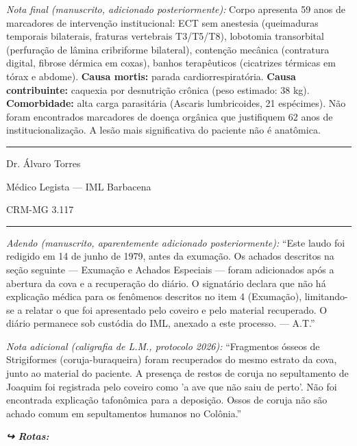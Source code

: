 \noindent \textit{Nota final (manuscrito, adicionado posteriormente):} Corpo apresenta 59 anos de marcadores de intervenção institucional: ECT sem anestesia (queimaduras temporais bilaterais, fraturas vertebrais T3/T5/T8), lobotomia transorbital (perfuração de lâmina cribriforme bilateral), contenção mecânica (contratura digital, fibrose dérmica em coxas), banhos terapêuticos (cicatrizes térmicas em tórax e abdome). \textbf{Causa mortis:} parada cardiorrespiratória. \textbf{Causa contribuinte:} caquexia por desnutrição crônica (peso estimado: 38 kg). \textbf{Comorbidade:} alta carga parasitária (Ascaris lumbricoides, 21 espécimes). Não foram encontrados marcadores de doença orgânica que justifiquem 62 anos de institucionalização. A lesão mais significativa do paciente não é anatômica.

\vspace{0.5em}\noindent\rule{\textwidth}{0.5pt}\vspace{0.5em}

\noindent Dr. Álvaro Torres

\noindent Médico Legista --- IML Barbacena

\noindent CRM-MG 3.117

\vspace{0.5em}\noindent\rule{\textwidth}{0.5pt}\vspace{0.5em}

\noindent \textit{Adendo (manuscrito, aparentemente adicionado posteriormente):} ``Este laudo foi redigido em 14 de junho de 1979, antes da exumação. Os achados descritos na seção seguinte --- Exumação e Achados Especiais --- foram adicionados após a abertura da cova e a recuperação do diário. O signatário declara que não há explicação médica para os fenômenos descritos no item 4 (Exumação), limitando-se a relatar o que foi apresentado pelo coveiro e pelo material recuperado. O diário permanece sob custódia do IML, anexado a este processo. --- A.T.''

\noindent \textit{Nota adicional (caligrafia de L.M., protocolo 2026):} ``Fragmentos ósseos de Strigiformes (coruja-buraqueira) foram recuperados do mesmo estrato da cova, junto ao material do paciente. A presença de restos de coruja no sepultamento de Joaquim foi registrada pelo coveiro como 'a ave que não saiu de perto'. Não foi encontrada explicação tafonômica para a deposição. Ossos de coruja não são achado comum em sepultamentos humanos no Colônia.''

\noindent\textit{\textbf{↪ Rotas:}  \rotasep {} \rotasep {} \rotasep {}}